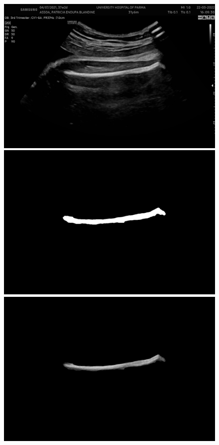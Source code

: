 \begin{figure}[!ht]
	\centering
	\begin{minipage}{0.32\textwidth}
		\centering
		\includegraphics[width=\textwidth]{./Immagini/nuovo_ecografo_results/0_image.png}
	\end{minipage}
	\hfill %
	\begin{minipage}{0.32\textwidth}
		\centering
		\includegraphics[width=\textwidth]{./Immagini/nuovo_ecografo_results/0_mask.png}
	\end{minipage}
	\hfill %
	\begin{minipage}{0.32\textwidth}
		\centering
		\includegraphics[width=\textwidth]{./Immagini/nuovo_ecografo_results/0_extracted_femur.png}

\end{minipage}
\end{figure}
